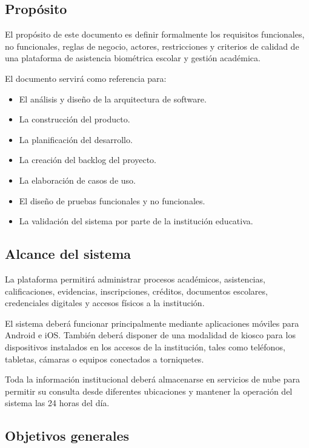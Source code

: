 \documentclass[12pt,a4paper]{article}
\begin{document}
\subsection{Propósito}

El propósito de este documento es definir formalmente los requisitos funcionales,
no funcionales, reglas de negocio, actores, restricciones y criterios de calidad
de una plataforma de asistencia biométrica escolar y gestión académica.

El documento servirá como referencia para:

\begin{itemize}[leftmargin=*]
\item El análisis y diseño de la arquitectura de software.
\item La construcción del producto.
\item La planificación del desarrollo.
\item La creación del backlog del proyecto.
\item La elaboración de casos de uso.
\item El diseño de pruebas funcionales y no funcionales.
\item La validación del sistema por parte de la institución educativa.
\end{itemize}

\subsection{Alcance del sistema}

La plataforma permitirá administrar procesos académicos, asistencias,
calificaciones, evidencias, inscripciones, créditos, documentos escolares,
credenciales digitales y accesos físicos a la institución.

El sistema deberá funcionar principalmente mediante aplicaciones móviles para
Android e iOS. También deberá disponer de una modalidad de kiosco para los
dispositivos instalados en los accesos de la institución, tales como teléfonos,
tabletas, cámaras o equipos conectados a torniquetes.

Toda la información institucional deberá almacenarse en servicios de nube para
permitir su consulta desde diferentes ubicaciones y mantener la operación del
sistema las 24 horas del día.

\subsection{Objetivos generales}
\end{document}
